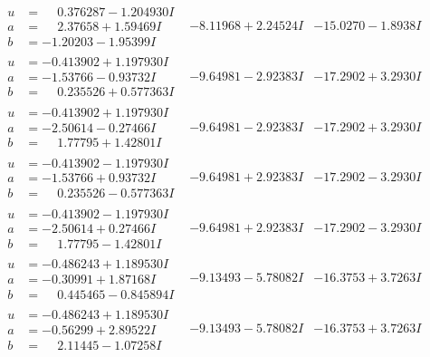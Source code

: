 \documentclass[1p]{elsarticle_modified}
\theoremstyle{definition}
\begin{document}
$$\begin{array}{c|c|c}
\begin{aligned}
u &= \phantom{-}0.376287 - 1.204930 I \\
a &= \phantom{-}2.37658 + 1.59469 I \\
b &= -1.20203 - 1.95399 I\end{aligned}
 & -8.11968 + 2.24524 I & -15.0270 - 1.8938 I \\ \hline\begin{aligned}
u &= -0.413902 + 1.197930 I \\
a &= -1.53766 - 0.93732 I \\
b &= \phantom{-}0.235526 + 0.577363 I\end{aligned}
 & -9.64981 - 2.92383 I & -17.2902 + 3.2930 I \\ \hline\begin{aligned}
u &= -0.413902 + 1.197930 I \\
a &= -2.50614 - 0.27466 I \\
b &= \phantom{-}1.77795 + 1.42801 I\end{aligned}
 & -9.64981 - 2.92383 I & -17.2902 + 3.2930 I \\ \hline\begin{aligned}
u &= -0.413902 - 1.197930 I \\
a &= -1.53766 + 0.93732 I \\
b &= \phantom{-}0.235526 - 0.577363 I\end{aligned}
 & -9.64981 + 2.92383 I & -17.2902 - 3.2930 I \\ \hline\begin{aligned}
u &= -0.413902 - 1.197930 I \\
a &= -2.50614 + 0.27466 I \\
b &= \phantom{-}1.77795 - 1.42801 I\end{aligned}
 & -9.64981 + 2.92383 I & -17.2902 - 3.2930 I \\ \hline\begin{aligned}
u &= -0.486243 + 1.189530 I \\
a &= -0.30991 + 1.87168 I \\
b &= \phantom{-}0.445465 - 0.845894 I\end{aligned}
 & -9.13493 - 5.78082 I & -16.3753 + 3.7263 I \\ \hline\begin{aligned}
u &= -0.486243 + 1.189530 I \\
a &= -0.56299 + 2.89522 I \\
b &= \phantom{-}2.11445 - 1.07258 I\end{aligned}
 & -9.13493 - 5.78082 I & -16.3753 + 3.7263 I \\ \hline\begin{aligned}

\end{aligned}
\end{array}$$
\end{document}
